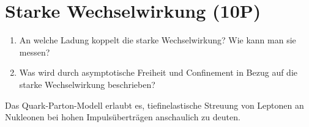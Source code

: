 \section{Starke Wechselwirkung (10P)}

\begin{enumerate}
\item An welche Ladung koppelt die starke Wechselwirkung? Wie kann man sie messen?%
\item Was wird durch asymptotische Freiheit und Confinement in Bezug auf die starke Wechselwirkung beschrieben?%
\end{enumerate}
Das Quark-Parton-Modell erlaubt es, tiefinelastische Streuung von Leptonen an Nukleonen bei hohen Impulsüberträgen anschaulich zu deuten.
